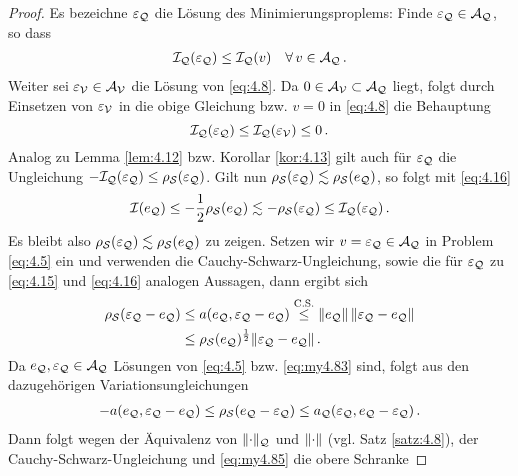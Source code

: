 \begin{itemize}
\begin{proof}
Es bezeichne $\varepsilon_{\mathcal Q}$ die Lösung des Minimierungsproplems: Finde $\varepsilon_{\mathcal Q}\in \mathcal A_{\mathcal Q}$, so dass
\begin{align}\label{eq:my4.83}
	\mathcal I_{\mathcal Q} (\varepsilon_{\mathcal Q}) \le \mathcal I_{\mathcal Q} (v) \quad \forall \, v \in \mathcal A_{\mathcal Q} \, .
\end{align}
Weiter sei $\varepsilon_{\mathcal V}\in \mathcal A_{\mathcal V}$ die Lösung von \eqref{eq:4.8}. Da $0 \in \mathcal A_{\mathcal V} \subset \mathcal A_{\mathcal Q}$ liegt, folgt durch Einsetzen von $\varepsilon_{\mathcal V}$ in die obige Gleichung bzw. $v = 0$ in \eqref{eq:4.8} die Behauptung
\[
	\mathcal I_{\mathcal Q}(\varepsilon_{\mathcal Q}) \le \mathcal I_{\mathcal Q} (\varepsilon_{\mathcal V}) \le 0 \, .
\]
Analog zu Lemma \ref{lem:4.12} bzw. Korollar \ref{kor:4.13} gilt auch für $\varepsilon_{\mathcal Q}$ die Ungleichung $-\mathcal I_{\mathcal Q} (\varepsilon_{\mathcal Q}) \le \rho_{\mathcal S} (\varepsilon_{\mathcal Q})$. Gilt nun $\rho_{\mathcal S} (\varepsilon_{\mathcal Q}) \lesssim \rho_{\mathcal S}(e_{\mathcal Q})$, so folgt mit \eqref{eq:4.16}
\[
	\mathcal I(e_{\mathcal Q}) \le -\frac 12 \rho_{\mathcal S} (e_{\mathcal Q}) \lesssim -\rho_{\mathcal S} (\varepsilon_{\mathcal Q}) \le \mathcal I_{\mathcal Q}(\varepsilon_{\mathcal Q}) \, .
\]
Es bleibt also $\rho_{\mathcal S} (\varepsilon_{\mathcal Q}) \lesssim \rho_{\mathcal S}(e_{\mathcal Q})$ zu zeigen. Setzen wir $v = \varepsilon_{\mathcal Q}\in \mathcal A_{\mathcal Q}$ in Problem \eqref{eq:4.5} ein und verwenden die Cauchy-Schwarz-Ungleichung, sowie die für $\varepsilon_{\mathcal Q}$ zu \eqref{eq:4.15} und \eqref{eq:4.16} analogen Aussagen, dann ergibt sich
\begin{align}\label{eq:my4.84}
\begin{aligned}
	\rho_{\mathcal S} (\varepsilon_{\mathcal Q}-e_{\mathcal Q}) &\le a(e_{\mathcal Q},\varepsilon_{\mathcal Q}-e_{\mathcal Q}) \stackrel{\scriptsize \text{C.S.}}\le \lVert e_{\mathcal Q}\rVert \, \lVert \varepsilon_{\mathcal Q}-e_{\mathcal Q}\rVert \\
	& \le \rho_{\mathcal S}(e_{\mathcal Q})^{\frac 12} \lVert \varepsilon_{\mathcal Q}-e_{\mathcal Q}\rVert \, .
\end{aligned}
\end{align}
Da $e_{\mathcal Q},\varepsilon_{\mathcal Q}\in \mathcal A_{\mathcal Q}$ Lösungen von \eqref{eq:4.5} bzw. \eqref{eq:my4.83} sind, folgt aus den dazugehörigen Variationsungleichungen
\begin{align}\label{eq:my4.85}
	-a(e_{\mathcal Q}, \varepsilon_{\mathcal Q}-e_{\mathcal Q}) \le \rho_{\mathcal S} (e_{\mathcal Q}-\varepsilon_{\mathcal Q}) \le a_{\mathcal Q} (\varepsilon_{\mathcal Q},e_{\mathcal Q}-\varepsilon_{\mathcal Q}) \, .
\end{align}
Dann folgt wegen der Äquivalenz von $\lVert \cdot\rVert_{\mathcal Q}$ und $\lVert \cdot\rVert$ (vgl. Satz \ref{satz:4.8}), der Cauchy-Schwarz-Ungleichung und \eqref{eq:my4.85} die obere Schranke

\end{proof}
\end{itemize}
